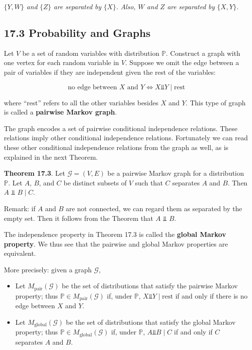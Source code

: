 \emph{\(\{Y, W\}\) and \(\{Z\}\) are separated by \(\{X\}\). Also, \(W\)
and \(Z\) are separated by \(\{X, Y\}\).}

\subsection*{17.3 Probability and Graphs}\label{probability:graphs}

Let \(V\) be a set of random variables with distribution \(\mathbb{P}\).
Construct a graph with one vertex for each random variable in \(V\).
Suppose we omit the edge between a pair of variables if they are
independent given the rest of the variables:

\[ \text{no edge between } X \text{ and } Y \Leftrightarrow X \text{⫫} Y \;|\; \text{rest} \]

where ``rest'' refers to all the other variables besides \(X\) and
\(Y\). This type of graph is called a \textbf{pairwise Markov graph}.

The graph encodes a set of pairwise conditional independence relations.
These relations imply other conditional independence relations.
Fortunately we can read these other conditional independence relations
from the graph as well, as is explained in the next Theorem.

\textbf{Theorem 17.3}. Let \(\mathcal{G} = (V, E)\) be a pairwise Markov
graph for a distribution \(\mathbb{P}\). Let \(A\), \(B\), and \(C\) be
distinct subsets of \(V\) such that \(C\) separates \(A\) and \(B\).
Then \(A \text{ ⫫ } B \;|\; C\).

Remark: if \(A\) and \(B\) are not connected, we can regard them as
separated by the empty set. Then it follows from the Theorem that
\(A \text{ ⫫ } B\).

The independence property in Theorem 17.3 is called the \textbf{global
Markov property}. We thus see that the pairwise and global Markov
properties are equivalent.

More precisely: given a graph \(\mathcal{G}\),

\begin{itemize}[tightlist]
\item
  Let \(M_\text{pair}(\mathcal{G})\) be the set of distributions that
  satisfy the pairwise Markov property; thus
  \(\mathbb{P} \in M_\text{pair}(\mathcal{G})\) if, under
  \(\mathbb{P}\), \(X \text{⫫} Y \;|\; \text{rest}\) if and only if
  there is no edge between \(X\) and \(Y\).
\item
  Let \(M_\text{global}(\mathcal{G})\) be the set of distributions that
  satisfy the global Markov property; thus
  \(\mathbb{P} \in M_\text{global}(\mathcal{G})\) if, under
  \(\mathbb{P}\), \(A \text{⫫} B \;|\; C\) if and only if \(C\)
  separates \(A\) and \(B\).
\end{itemize}

